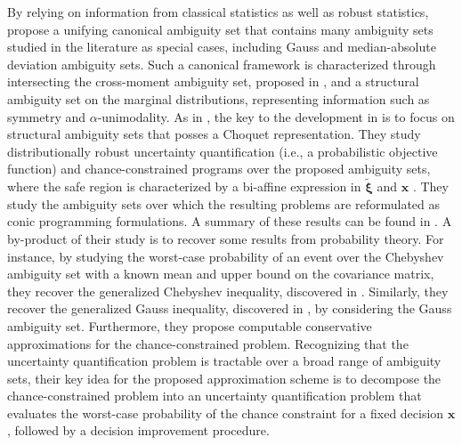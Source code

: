 \documentclass[final,onefignum,onetabnum]{class}
\newcommand{\bs}[1]{\boldsymbol{#1}} %
\newcommand{\txi}{\tilde{\bs{\xi}}}
\begin{document}
By relying on information from classical statistics as well as robust statistics, \citet{hanasusanto2015chance} propose a unifying canonical ambiguity set that contains many ambiguity sets studied in the literature as special cases, including  Gauss and median-absolute deviation ambiguity sets. %
Such a canonical framework  is characterized through intersecting the cross-moment ambiguity set, proposed in \citet{wiesemann2014}, and a  structural ambiguity set  on the marginal distributions, representing information  such as symmetry and $\alpha$-unimodality. %
As in \cite{popescu2005semidefinite}, the key to the development in \citet{hanasusanto2015chance} is to focus on structural ambiguity sets that posses a  Choquet representation. %
They study  distributionally robust uncertainty quantification (i.e., a probabilistic objective function) and  chance-constrained programs over the proposed ambiguity sets, where the  safe region is characterized by a bi-affine expression in $\txi$ and  $\bs{x}$%
.
They study the ambiguity sets over which the resulting problems are reformulated as conic programming formulations. A summary of these results can be found in \citet[Table 2]{hanasusanto2015chance}.
A by-product of their study is to recover some results from probability theory. 
For instance, by studying the worst-case probability of an event over the Chebyshev ambiguity set with a known mean and upper bound on the covariance matrix, they recover the generalized Chebyshev inequality, discovered in  \citet{popescu2005semidefinite,vandenberghe2007}. Similarly, they recover  the generalized Gauss inequality, discovered in \citet{vanparys2016SDP}, by considering the Gauss ambiguity set. 
Furthermore, they  propose computable conservative approximations for the chance-constrained problem. Recognizing  that the  uncertainty quantification problem is tractable over a broad range of ambiguity sets, their key idea  for the proposed approximation scheme is to decompose the chance-constrained problem into an uncertainty quantification problem that evaluates the worst-case probability of the chance constraint  for a fixed decision $\bs{x}$, followed by a decision improvement procedure. 
\end{document}
